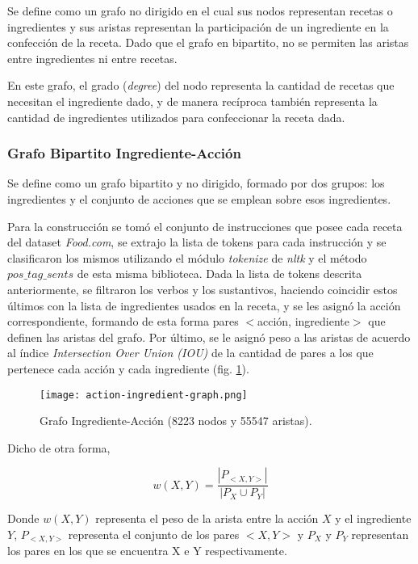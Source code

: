 \documentclass[
	a4paper, %
	10pt, %
	unnumberedsections, %
	twoside, %
]{LTJournalArticle}
\begin{document}
Se define como un grafo no dirigido en el cual sus nodos representan
recetas o ingredientes y sus aristas representan la participación de un ingrediente en la confección de la receta.
Dado que el grafo en bipartito, no se permiten las aristas entre ingredientes ni entre recetas.

En este grafo, el grado (\textit{degree}) del nodo representa la cantidad de recetas que necesitan
el ingrediente dado, y de manera recíproca también representa la cantidad de ingredientes utilizados para 
confeccionar la receta dada.

\subsubsection{Grafo Bipartito Ingrediente-Acción}

Se define como un grafo bipartito y no dirigido, formado por dos grupos: los ingredientes y el conjunto de acciones que se emplean sobre esos ingredientes. 

Para la construcción se tomó el conjunto de instrucciones que posee cada receta del dataset \textit{Food.com}, se extrajo la lista de tokens para cada instrucción y se clasificaron los mismos utilizando el módulo \emph{tokenize} de \textit{nltk} y el método \emph{$pos\_tag\_sents$} de esta misma biblioteca. Dada la lista de tokens descrita anteriormente, se filtraron los verbos y los sustantivos, haciendo coincidir estos últimos con la lista de ingredientes usados en la receta, y se les asignó la acción correspondiente, formando de esta forma pares $<$acción, ingrediente$>$ que definen las aristas del grafo. Por último, se le asignó peso a las aristas de acuerdo al índice \textit{Intersection Over Union (IOU)} de la cantidad de pares a los que pertenece cada acción y cada ingrediente (fig. \ref{fig:ingredient-action-graph}). 

\begin{figure}
	\texttt{[image: action-ingredient-graph.png]}
	\caption{Grafo Ingrediente-Acción (8223 nodos y 55547 aristas).}
	\label{fig:ingredient-action-graph}
\end{figure}

Dicho de otra forma,

$$w(X, Y) = \frac{|P_{<X,Y>}|}{|P_X \cup P_Y|}$$

Donde $w(X,Y)$ representa el peso de la arista entre la acción $X$ y el ingrediente $Y$, $P_{<X,Y>}$ representa el conjunto de los pares $<X,Y>$ y $P_X$ y $P_Y$ representan los pares en los que se encuentra X e Y respectivamente.
\end{document}
